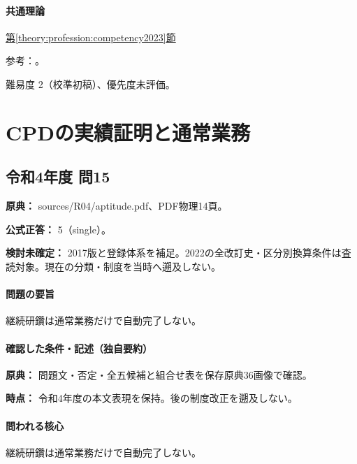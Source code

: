 \paragraph{共通理論} \hyperref[theory:profession:competency2023]{第\ref*{theory:profession:competency2023}節}

\par 参考：\cite{eth54_competency2023}。

\par 難易度 2（校準初稿）、優先度未評価。

\section{CPDの実績証明と通常業務}

\subsection{令和4年度 問15}
\label{q:r04-reg-apt-15}

\noindent\textbf{原典：} sources/R04/aptitude.pdf、PDF物理14頁。

\textbf{公式正答：} 5（single）。

\par\textbf{検討未確定：} 2017版と登録体系を補足。2022の全改訂史・区分別換算条件は査読対象。現在の分類・制度を当時へ遡及しない。

\paragraph{問題の要旨} 継続研鑽は通常業務だけで自動完了しない。

\paragraph{確認した条件・記述（独自要約）}\mbox{}\par

\noindent\textbf{原典：} 問題文・否定・全五候補と組合せ表を保存原典36画像で確認。\par

\noindent\textbf{時点：} 令和4年度の本文表現を保持。後の制度改正を遡及しない。\par

\paragraph{問われる核心} 継続研鑽は通常業務だけで自動完了しない。

